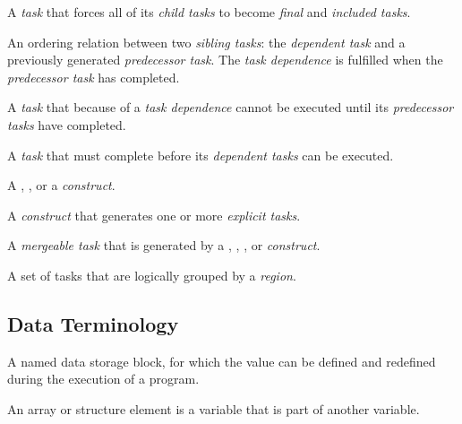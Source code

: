 \glossarydefstart
A \emph{task} that forces all of its \emph{child tasks} to become \emph{final} and \emph{included tasks}.
\glossarydefend

\glossarydefstart
An ordering relation between two \emph{sibling tasks}: the \emph{dependent task} and a 
previously generated \emph{predecessor task}. The \emph{task dependence} is fulfilled when the 
\emph{predecessor task} has completed.
\glossarydefend

\begin{samepage}
\glossarydefstart
A \emph{task} that because of a \emph{task dependence} cannot be executed until its \emph{predecessor 
tasks} have completed.
\glossarydefend
\end{samepage}

\glossarydefstart
A \emph{task} that must complete before its \emph{dependent tasks} can be executed.
\glossarydefend

\glossarydefstart
A , , or a  \emph{construct}.
\glossarydefend
\bigskip

\glossarydefstart
A \emph{construct} that generates one or more \emph{explicit tasks}.
\glossarydefend
\bigskip

\glossarydefstart
A \emph{mergeable task} that is generated by a , , , or  \emph{construct}.
\glossarydefend

\glossarydefstart
A set of tasks that are logically grouped by a  \emph{region}.
\glossarydefend

\subsection{Data Terminology}
\label{subsec:Data Terminology} 
\glossarydefstart
A named data storage block, for which the value can be defined and redefined during the 
execution of a program.

\begin{adjustwidth}{-0.75in}{0in}
\begin{note}
An array or structure element is a variable that is part of another variable.
\end{note}
\end{adjustwidth}
\glossarydefend

